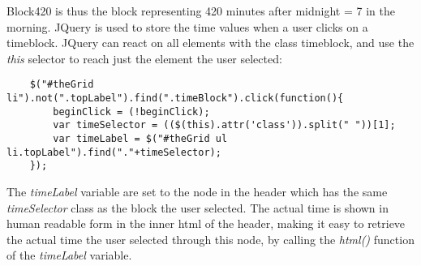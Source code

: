 Block420 is thus the block representing 420 minutes after midnight = 7 in the morning. JQuery is used to store the time values when a user clicks on a timeblock. JQuery can react on all elements with the class timeblock, and use the \emph{this} selector to reach just the element the user selected:

\begin{verbatim}
    $("#theGrid li").not(".topLabel").find(".timeBlock").click(function(){
        beginClick = (!beginClick);
        var timeSelector = (($(this).attr('class')).split(" "))[1];
        var timeLabel = $("#theGrid ul li.topLabel").find("."+timeSelector);
    });
\end{verbatim}

The \emph{timeLabel} variable are set to the node in the header which has the same \emph{timeSelector} class as the block the user selected. The actual time is shown in human readable form in the inner html of the header, making it easy to retrieve the actual time the user selected through this node, by calling the \emph{html()} function of the \emph{timeLabel} variable.